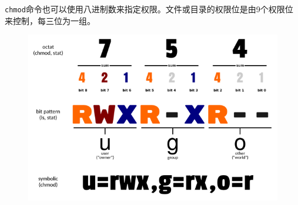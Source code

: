 \documentclass[12pt, openany, oneside]{book}
\begin{document}
\begin{table}[H]
	\centering
	\caption{\lstinline|chmod|参数说明}
\end{table}

\lstinline|chmod|命令也可以使用八进制数来指定权限。文件或目录的权限位是由9个权限位来控制，每三位为一组。

\begin{figure}[H]
	\centering
	\includegraphics[scale=0.8]{img/C5/5-2/4.png}
\end{figure}
\end{document}
